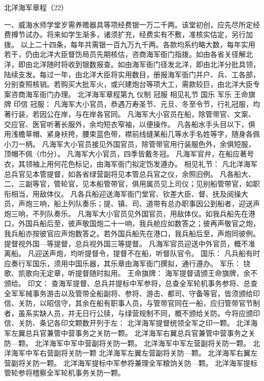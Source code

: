 \documentclass[12pt,UTF8]{ctexbook}
\begin{document}
北洋海军章程（22）

一、威海水师学堂岁需养赡器具等项经费银一万二千两。该堂初创，应先尽所定经费撙节试办。将来如学生渐多，诸须扩充，经费实有不敷，准核实估定，另行加拨。
以上二十四条，每年共需银一百九万九千两。各款均系约略大数，每年实用若干，仍由北洋大臣督饬局员先期核估，咨商海军衙门指拨。如由各省关径解北洋，即由北洋随时将收到银数报查。如由海军衙门径发北洋，即由北洋分批具领，陆续支发。每过一年，由北洋大臣将实用数目，册报海军衙门并户、兵、工各部，分别查照核销。若购买大批军火，或兴建炮台等项大工，需款较巨，由北洋大臣专案咨商海军衙门办理。
北洋海军章程第九
仪制 冠服 相见礼节 国乐 军乐 王命旗牌 印信
冠服：
凡海军大小官员，恭遇万寿圣节、元旦、冬至令节，行礼冠服，均著行装，若因公在岸，与在岸各官同。
凡海军大小官员在船，除管带官、文案、交应官、医官听著长服外，余均短衣窄袖，以便操作。
凡各船水手头目以下，俱用浅檐草帽、紧身袄挎，腰束蓝色带，襟前线缝某船几等水手名姓等字，随身各佩小刀一柄。
凡海军大小官员接见外国官员，除管带官用行装服色外，余俱短服，顶帽不佩（巾分）。
凡海军大小官员，四季皆戴冬冠。
凡海军官弁，在船应著号衣，其领袖上用何花色标记，由海军衙门拟定饬发遵办。
相见礼节：
凡北洋海军总兵官见本管提督，如各省绿营副将见本管总兵官之仪，余照旧例。
凡各船大、二、三副等官，管轮官，见本船管带官，俱用属员见上司仪；见别船管带官，如职衔相当，用敌体仪。
凡各兵船迎送海军衙门堂官、钦差大臣、督、抚及阅操大员，声炮三响，船上列队奏乐；提、镇、司、道带有总办职事因公到船者，迎送声炮三响，不列队奏乐。
凡海军大小官员见外国官员，用敌体仪。如我兵船先在港口，外国兵船后至，彼声敬国炮二十一响，我兵舱应如数答之；彼再声敬官之炮，我兵船亦按彼官应声炮数答之。若外国兵船先在港口，我兵船后至，声炮同彼例。提督视外国—等提督，总兵视外国三等提督。
凡海军官员迎送中外官员，概不准离船。
凡迎送声炮，均听提督令，提督不在船，听督队官令。
国乐：
凡兵船有时应奏行军国乐，须用中国乐器，其乐章由海军衙门撰拟，通行遵办。
军乐：
铙歌、凯歌向无定章，听提督随时拟用。
王命旗牌：
海军提督请颁王命旗牌，余不颁给。
印文：
查海军提督、总兵并提标中军参将，总查全军轮机事务参将、总查全军军械事务游击以及管带全船副将、参将、游击、都司、守备等官，皆须颁给印信、关防，以昭信守，其余在船有职事人员，与管带官同在一船，应归管带官节制者，虽系实缺人员，并无日行公牍，与绿营规制不同，概不颁给关防。今将应颁印信、关防、条记各印文颗数开列于左：
北洋海军提督统领全军之印一颗。
北洋海军左翼总兵官兼管中营事务之关防一颗。
北洋海军右翼总兵官兼管中营事务之关防—颗。
北洋海军中军中营副将关防一颗。
北洋海军中军左营副将关防一颗。
北洋海军中军右营副将关防一颗
北洋海军左翼左营副将关防—颗。
北洋海军右翼左营副将关防一颗。
北洋海军提标中军参将兼理全军粮饷关防—颗。
北洋海军提标管轮参将稽察全军轮机事务关防一颗。
\end{document}
